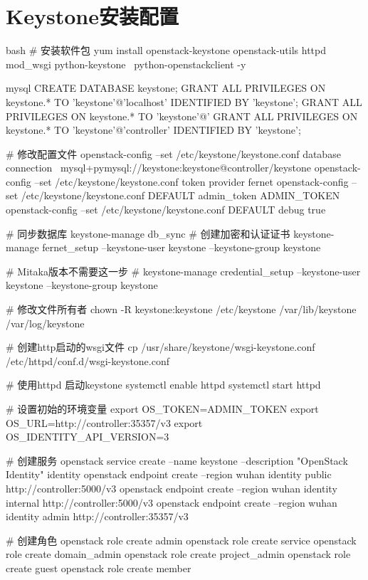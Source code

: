\section{Keystone安装配置}
\begin{code-block}{bash}
# 安装软件包
yum install openstack-keystone openstack-utils httpd mod_wsgi python-keystone \
    python-openstackclient -y

mysql
CREATE DATABASE keystone;
GRANT ALL PRIVILEGES ON keystone.* TO 'keystone'@'localhost' IDENTIFIED BY 'keystone';
GRANT ALL PRIVILEGES ON keystone.* TO 'keystone'@'%
GRANT ALL PRIVILEGES ON keystone.* TO 'keystone'@'controller' IDENTIFIED BY 'keystone';

# 修改配置文件
openstack-config --set /etc/keystone/keystone.conf database connection \
    mysql+pymysql://keystone:keystone@controller/keystone
openstack-config --set /etc/keystone/keystone.conf token provider fernet
openstack-config --set /etc/keystone/keystone.conf DEFAULT admin_token ADMIN_TOKEN
openstack-config --set /etc/keystone/keystone.conf DEFAULT debug true

# 同步数据库
keystone-manage db_sync
# 创建加密和认证证书
keystone-manage fernet_setup --keystone-user keystone --keystone-group keystone

# Mitaka版本不需要这一步
# keystone-manage credential_setup --keystone-user keystone --keystone-group keystone

# 修改文件所有者
chown -R keystone:keystone /etc/keystone /var/lib/keystone /var/log/keystone

# 创建http启动的wsgi文件
cp /usr/share/keystone/wsgi-keystone.conf /etc/httpd/conf.d/wsgi-keystone.conf

# 使用httpd 启动keystone
systemctl enable httpd
systemctl start httpd

# 设置初始的环境变量
export OS_TOKEN=ADMIN_TOKEN
export OS_URL=http://controller:35357/v3
export OS_IDENTITY_API_VERSION=3

# 创建服务
openstack service create --name keystone --description "OpenStack Identity" identity
openstack endpoint create --region wuhan identity public http://controller:5000/v3
openstack endpoint create --region wuhan identity internal http://controller:5000/v3
openstack endpoint create --region wuhan identity admin http://controller:35357/v3

# 创建角色
openstack role create admin
openstack role create service
openstack role create domain_admin
openstack role create project_admin
openstack role create guest
openstack role create member


\end{code-block}
